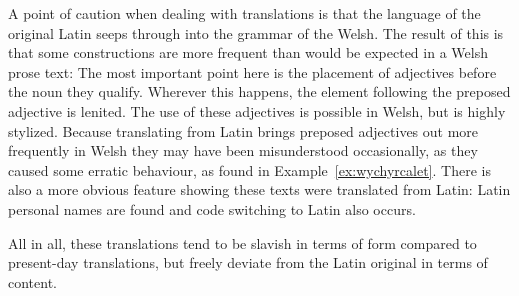 A point of caution when dealing with translations is that the language of the original Latin seeps through into the grammar of the Welsh.
The result of this is that some constructions are more frequent than would be expected in a Welsh prose text:
The most important point here is the placement of adjectives before the noun they qualify.
Wherever this happens, the element following the preposed adjective is lenited.
The use of these adjectives is possible in Welsh, but is highly stylized.
Because translating from Latin brings preposed adjectives out more frequently in Welsh they may have been misunderstood occasionally, as they caused some erratic behaviour, as found in Example~\ref{ex:wychyrcalet}.
There is also a more obvious feature showing these texts were translated from Latin: Latin personal names are found and code switching to Latin also occurs.  

All in all, these translations tend to be slavish in terms of form compared to present-day translations, but freely deviate from the Latin original in terms of content. 





